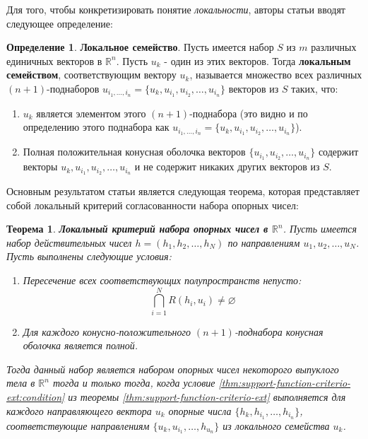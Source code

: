 \documentclass[a4paper, 12pt, titlepage]{article}
\theoremstyle{definition}
\newtheorem{SmartDefinition}{Определение}
\theoremstyle{plain}
\newtheorem{SmartTheorem}{Теорема}
\theoremstyle{plain}
\begin{document}
Для того, чтобы конкретизировать понятие \textit{локальности}, авторы статьи
вводят следующее определение:

\begin{SmartDefinition}
 \label{def:local-family}
 \textbf{Локальное семейство}.
 Пусть имеется набор $\mathit{S}$ из $m$ различных единичных векторов в
 $\mathbb{R}^{n}$. Пусть $u_{k}$ - один из этих векторов. Тогда
 \textbf{локальным семейством}, соответствующим вектору $u_{k}$, называется 
 множество всех различных $(n + 1)$-поднаборов $u_{i_{1}, \ldots, 
 i_{n}} = \{u_{k}, u_{i_{1}}, u_{i_{2}}, \ldots, u_{i_{n}}\}$ векторов из 
 $\mathit{S}$ таких,
 что:
 \begin{enumerate}
  \item $u_{k}$ является элементом этого $(n + 1)$-поднабора (это видно и по 
  определению этого поднабора как $u_{i_{1}, \ldots, 
 i_{n}} = \{u_{k}, u_{i_{1}}, u_{i_{2}}, \ldots, u_{i_{n}}\}$).
  \item Полная положительная конусная оболочка векторов $\{u_{i_{1}}, 
  u_{i_{2}}, \ldots, u_{i_{n}}\}$ содержит векторы $u_{k}, u_{i_{1}}, u_{i_{2}}, 
  \ldots, u_{i_{n}}$ и не содержит никаких других векторов из $\mathit{S}$.
 \end{enumerate}
\end{SmartDefinition}

Основным результатом статьи является следующая теорема, которая представляет
собой локальный критерий согласованности набора опорных чисел:

\begin{SmartTheorem}
 \label{thm:local-global-consistency-equivalence}
 \textbf{Локальный критерий набора опорных чисел в $\mathbb{R}^{n}$}.
 Пусть имеется набор действительных чисел $h = (h_{1}, h_{2}, \ldots, h_{N})$ по
 направлениям $u_{1}, u_{2}, \ldots, u_{N}$. Пусть выполнены следующие 
 условия:
 \begin{enumerate}
  \item Пересечение всех соответствующих полупространств непусто:
  \begin{equation}
   \bigcap \limits_{i = 1}^{N} R(h_{i}, u_{i}) \neq \varnothing
  \end{equation}
  \item Для каждого конусно-положительного $(n + 1)$-поднабора конусная оболочка
  является полной.
 \end{enumerate}

 Тогда данный набор является набором опорных чисел некоторого выпуклого тела в 
 $\mathbb{R}^{n}$ тогда и только тогда, когда условие 
 \ref{thm:support-function-criterio-ext:condition} из теоремы
 \ref{thm:support-function-criterio-ext} выполняется для каждого направляющего
 вектора $u_{k}$ опорные числа $\{h_{k}, h_{i_{1}}, \ldots, h_{i_{n}}\}$, 
 соответствующие направлениям $\{u_{k}, u_{i_{1}}, \ldots, h_{u_{n}}\}$ из 
 локального семейства $u_{k}$.
\end{SmartTheorem}
\end{document}
